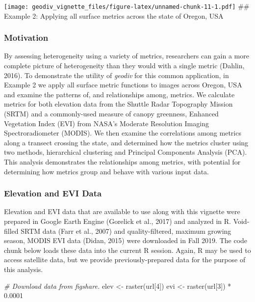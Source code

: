 \documentclass[
]{article}
\newenvironment{Shaded}{\begin{snugshade}}{\end{snugshade}}
\newcommand{\CommentTok}[1]{\textcolor[rgb]{0.56,0.35,0.01}{\textit{#1}}}
\newcommand{\DecValTok}[1]{\textcolor[rgb]{0.00,0.00,0.81}{#1}}
\newcommand{\FloatTok}[1]{\textcolor[rgb]{0.00,0.00,0.81}{#1}}
\newcommand{\FunctionTok}[1]{\textcolor[rgb]{0.00,0.00,0.00}{#1}}
\newcommand{\NormalTok}[1]{#1}
\newcommand{\OtherTok}[1]{\textcolor[rgb]{0.56,0.35,0.01}{#1}}
\newcommand{\SpecialCharTok}[1]{\textcolor[rgb]{0.00,0.00,0.00}{#1}}
\begin{document}
\texttt{[image: geodiv\_vignette\_files/figure-latex/unnamed-chunk-11-1.pdf]}
\#\# Example 2: Applying all surface metrics across the state of Oregon,
USA

\hypertarget{motivation}{%
\subsubsection{Motivation}\label{motivation}}

By assessing heterogeneity using a variety of metrics, researchers can
gain a more complete picture of heterogeneity than they would with a
single metric (Dahlin, 2016). To demonstrate the utility of
\emph{geodiv} for this common application, in Example 2 we apply all
surface metric functions to images across Oregon, USA and examine the
patterns of, and relationships among, metrics. We calculate metrics for
both elevation data from the Shuttle Radar Topography Mission (SRTM) and
a commonly-used measure of canopy greenness, Enhanced Vegetation Index
(EVI) from NASA's Moderate Resolution Imaging Spectroradiometer (MODIS).
We then examine the correlations among metrics along a transect crossing
the state, and determined how the metrics cluster using two methods,
hierarchical clustering and Principal Components Analysis (PCA). This
analysis demonstrates the relationships among metrics, with potential
for determining how metrics group and behave with various input data.

\hypertarget{elevation-and-evi-data}{%
\subsubsection{Elevation and EVI Data}\label{elevation-and-evi-data}}

Elevation and EVI data that are available to use along with this
vignette were prepared in Google Earth Engine (Gorelick et al., 2017)
and analyzed in R. Void-filled SRTM data (Farr et al., 2007) and
quality-filtered, maximum growing season, MODIS EVI data (Didan, 2015)
were downloaded in Fall 2019. The code chunk below loads these data into
the current R session. Again, R may be used to access satellite data,
but we provide previously-prepared data for the purpose of this
analysis.

\begin{Shaded}
\begin{Highlighting}[]
\CommentTok{\# Download data from figshare. }
\NormalTok{elev }\OtherTok{\textless{}{-}} \FunctionTok{raster}\NormalTok{(url[}\DecValTok{4}\NormalTok{])}
\NormalTok{evi }\OtherTok{\textless{}{-}} \FunctionTok{raster}\NormalTok{(url[}\DecValTok{3}\NormalTok{]) }\SpecialCharTok{*} \FloatTok{0.0001}
\end{Highlighting}
\end{Shaded}
\end{document}
